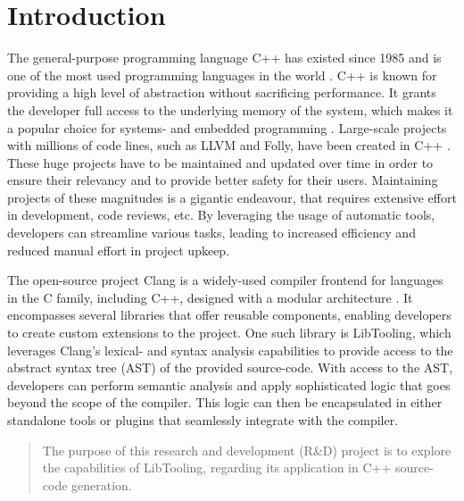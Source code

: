 \chapter{Introduction}

The general-purpose programming language C++ has existed since 1985 and is one of the most used programming languages in the world \cite{nexttechnologyprofessionalsMostPopularProgramming2022}.
C++ is known for providing a high level of abstraction without sacrificing performance.
It grants the developer full access to the underlying memory of the system, which makes it a popular choice for systems- and embedded programming  \cite{adminWhereUsedIndustry2021}.
Large-scale projects with millions of code lines, such as LLVM and Folly, have been created in C++ \cite{llvmLLVMCompilerInfrastructure, facebookFollyFacebookOpensource2023}.
These huge projects have to be maintained and updated over time in order to ensure their relevancy and to provide better safety for their users.
Maintaining projects of these magnitudes is a gigantic endeavour, that requires extensive effort in development, code reviews, etc.
By leveraging the usage of automatic tools, developers can streamline various tasks, leading to increased efficiency and reduced manual effort in project upkeep.

The open-source project Clang is a widely-used compiler frontend for languages in the C family, including C++, designed with a modular architecture \cite{clangClangLanguageFamily}.
It encompasses several libraries that offer reusable components, enabling developers to create custom extensions to the project.
One such library is LibTooling, which leverages Clang's lexical- and syntax analysis capabilities to provide access to the abstract syntax tree (AST) of the provided source-code.
With access to the AST, developers can perform semantic analysis and apply sophisticated logic that goes beyond the scope of the compiler.
This logic can then be encapsulated in either standalone tools or plugins that seamlessly integrate with the compiler.

\begin{quote}
    The purpose of this research and development (R\&D) project is to explore the capabilities of LibTooling, regarding its application in C++ source-code generation.
\end{quote}

